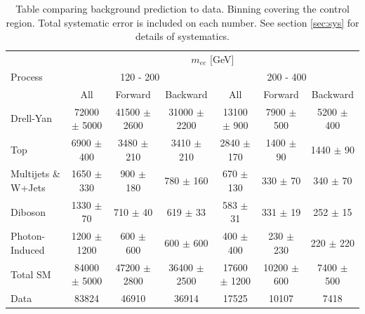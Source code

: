 	\begin {table}[h]
		\footnotesize 
		\begin{center}
		\begin{tabular}{  l | c c c | c c c  } 
			\hline
			\hline
			\multirow{3}{*}{Process} 	& \multicolumn{6}{c}{$m_{ee}$ [GeV]} \\
										& \multicolumn{3}{c}{120 - 200} & \multicolumn{3}{c}{200 - 400} \\
										\cline{2-7}
										& All & Forward & Backward & All & Forward & Backward \\
			\hline
			Drell-Yan & 72000 $\pm$ 5000 & 41500 $\pm$ 2600 & 31000 $\pm$ 2200 & 13100 $\pm$ 900 & 7900 $\pm$ 500 & 5200 $\pm$ 400 \\
			Top & 6900 $\pm$ 400 & 3480 $\pm$ 210 & 3410 $\pm$ 210 & 2840 $\pm$ 170 & 1400 $\pm$ 90 & 1440 $\pm$ 90 \\
			Multijets \& W+Jets & 1650 $\pm$ 330 & 900 $\pm$ 180 & 780 $\pm$ 160 & 670 $\pm$ 130 & 330 $\pm$ 70 & 340 $\pm$ 70 \\
			Diboson & 1330 $\pm$ 70 & 710 $\pm$ 40 & 619 $\pm$ 33 & 583 $\pm$ 31 & 331 $\pm$ 19 & 252 $\pm$ 15 \\
			Photon-Induced & 1200 $\pm$ 1200 & 600 $\pm$ 600 & 600 $\pm$ 600 & 400 $\pm$ 400 & 230 $\pm$ 230 & 220 $\pm$ 220 \\
			\hline
			Total SM & 84000 $\pm$ 5000 & 47200 $\pm$ 2800 & 36400 $\pm$ 2500 & 17600 $\pm$ 1200 & 10200 $\pm$ 600 & 7400 $\pm$ 500 \\
			\hline
			Data & 83824 & 46910 & 36914 & 17525 & 10107 & 7418 \\
			\hline
			\hline
		\end{tabular}
	  	\caption{Table comparing background prediction to data. Binning covering the control region. Total systematic error is included on each number. See section \ref{sec:sys} for details of systematics.}
	  	\label{tab:CI_results0}
	  	\end{center}
	\end {table}

